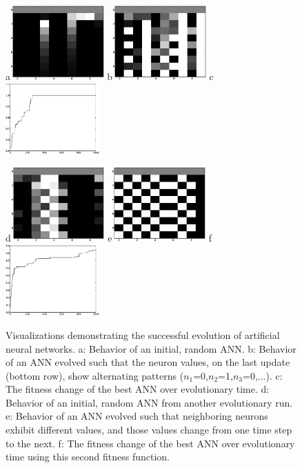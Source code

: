 \documentclass[12pt]{article}
\begin{document}
\begin{figure}[!t]
\centerline{
a\includegraphics[width=0.32\textwidth]{Fig1a}
b\includegraphics[width=0.32\textwidth]{Fig1b}
c\includegraphics[width=0.32\textwidth]{Fig1c}
}
\centerline{
d\includegraphics[width=0.32\textwidth]{Fig1d}
e\includegraphics[width=0.32\textwidth]{Fig1e}
f\includegraphics[width=0.32\textwidth]{Fig1f}
}
\caption{Visualizations demonstrating the successful evolution of artificial neural networks.
a: Behavior of an initial, random ANN.
b: Behavior of an ANN evolved such that the neuron values, on the last update (bottom row), show alternating patterns ($n_1$=0,$n_2$=1,$n_3$=0,...).
c: The fitness change of the best ANN over evolutionary time.
d: Behavior of an initial, random ANN from another evolutionary run.
e: Behavior of an ANN evolved such that neighboring neurons exhibit different values, and those values change from one time step to the next.
f: The fitness change of the best ANN over evolutionary time using this second fitness function.
}
\label{Fig}
\end{figure}
\end{document}
